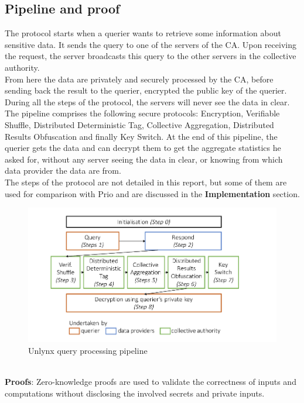 \documentclass{article}
\begin{document}
\subsection{Pipeline and proof}
The protocol starts when a querier wants to retrieve some information about sensitive data. It sends the query to one of the servers of the CA. Upon receiving the request, the server broadcasts this query to the other servers in the collective authority.\\
From here the data are privately and securely processed by the CA, before sending back the result to the querier, encrypted the public key of the querier. During all the steps of the protocol, the servers will never see the data in clear.\\
The pipeline comprises the following secure protocols: Encryption, Verifiable Shuffle, Distributed Deterministic Tag, Collective Aggregation, Distributed Results Obfuscation and finally Key Switch. At the end of this pipeline, the querier gets the data and can decrypt them to get the aggregate statistics he asked for, without any server seeing the data in clear, or knowing from which data provider the data are from.\\
The steps of the protocol are not detailed in this report, but some of them are used for comparison with Prio and are discussed in the \textbf{Implementation} section.
\begin{figure}[h]
\centering
\includegraphics[scale=0.5]{img/unlynxPip.png}
\caption{Unlynx query processing pipeline}
\end{figure}
\\
\textbf{Proofs}: Zero-knowledge proofs are used to validate the correctness of inputs and computations without disclosing the involved secrets and private inputs.\\
\end{document}
